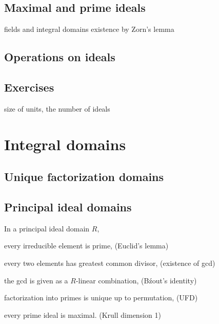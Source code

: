 \documentclass{../../large}
\begin{document}
\begin{prb}
\end{prb}
\begin{prb}
\end{prb}


\section{Maximal and prime ideals}
fields and integral domains
existence by Zorn's lemma

\section{Operations on ideals}

\section*{Exercises}
size of units, the number of ideals








\chapter{Integral domains}
\section{Unique factorization domains}
\section{Principal ideal domains}

\begin{prb}
In a principal ideal domain $R$,
\begin{parts}
\item every irreducible element is prime, \hfill(Euclid's lemma)
\item every two elements has greatest common divisor, \hfill(existence of gcd)
\item the gcd is given as a $R$-linear combination, \hfill(B\'zout's identity)
\item factorization into primes is unique up to permutation, \hfill(UFD)
\item every prime ideal is maximal. \hfill(Krull dimension 1)
\end{parts}
\end{prb}
\end{document}
